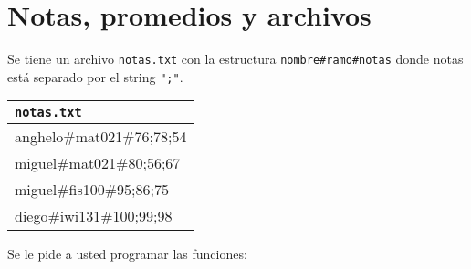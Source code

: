 \section{Notas, promedios y archivos}

Se tiene un archivo \texttt{notas.txt} con la estructura \texttt{nombre\#ramo\#notas} donde notas está separado por el string \texttt{";"}.

\begin{center}
\begin{tabular}{|l|}
    \hline
    \texttt{notas.txt} \\ 
    \hline
    anghelo\#mat021\#76;78;54 \\
    miguel\#mat021\#80;56;67 \\
    miguel\#fis100\#95;86;75 \\
    diego\#iwi131\#100;99;98 \\
    \hline
\end{tabular}
\end{center}


Se le pide a usted programar las funciones:

